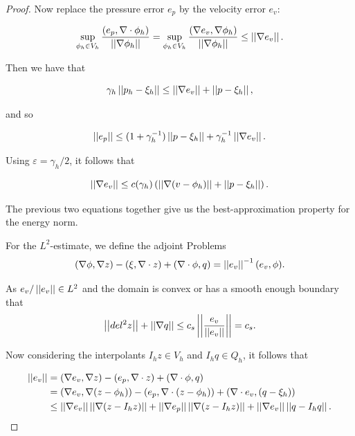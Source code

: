 \documentclass[12pt]{article}
\begin{document}
\begin{proof}
            Now replace the pressure error $e_p$ by the velocity error $e_v$:

            \begin{equation}
                \sup_{\phi_h \in V_h} \frac{(e_p, \nabla \cdot \phi_h)}{\left|\left|\nabla
                \phi_h\right|\right|} = \sup_{\phi_h \in V_h} \frac{(\nabla e_v, \nabla
                \phi_h)}{\left|\left|\nabla \phi_h\right|\right|} \leq \left|\left|\nabla e_v\right|\right|.
            \end{equation}

            Then we have that

            \begin{equation}
                \gamma_h \left|\left|p_h - \xi_h\right|\right| \leq \left|\left|\nabla e_v\right|\right| + \left|\left|p - \xi_h\right|\right|,
            \end{equation}

            and so

            \begin{equation}
                \left|\left|e_p\right|\right| \leq (1 + \gamma_h^{-1}) \left|\left|p - \xi_h\right|\right| + \gamma_h^{-1}
                \left|\left|\nabla e_v\right|\right|.
            \end{equation}

            Using $\varepsilon = \gamma_h / 2$, it follows that

            \begin{equation}
                \left|\left|\nabla e_v\right|\right| \leq c(\gamma_h) \left( \left|\left|\nabla (v-\phi_h)\right|\right| + \left|\left|p
                - \xi_h\right|\right| \right).
            \end{equation}

            The previous two equations together give us the best-approximation property
            for the energy norm.

            For the $L^2$-estimate, we define the adjoint Problems
            \[
                (\nabla \phi, \nabla z) - (\xi, \nabla \cdot z) + (\nabla \cdot \phi, q) =
                \left|\left|e_v\right|\right|^{-1}(e_v, \phi).
                \]

                As $e_v / \left|\left|e_v\right|\right| \in L^2$ and the domain is convex or has a smooth
                enough boundary that
                \[
                    \left|\left|del^2 z\right|\right| + \left|\left|\nabla q\right|\right| \leq c_s \left|\left|\frac{e_v}{\left|\left|e_v\right|\right|}\right|\right| =
                    c_s.
                    \]

                    Now considering the interpolants $I_h z \in V_h$ and $I_h q \in Q_h$, it
                    follows that

                    \begin{align*}
                        \left|\left|e_v\right|\right| &= (\nabla e_v, \nabla z) - (e_p, \nabla \cdot z) + (\nabla \cdot
                        \phi, q) \\
                        &= (\nabla e_v, \nabla(z - \phi_h)) - (e_p, \nabla \cdot (z - \phi_h)) +
                        (\nabla \cdot e_v, (q - \xi_h)) \\
                        & \leq \left|\left|\nabla e_v\right|\right| \left|\left|\nabla(z - I_h z)\right|\right| + \left|\left|\nabla e_p\right|\right|
                        \left|\left|\nabla (z - I_h z)\right|\right| + \left|\left|\nabla e_v\right|\right| \left|\left|q - I_h q\right|\right|.
                    \end{align*}


\end{proof}
\end{document}

